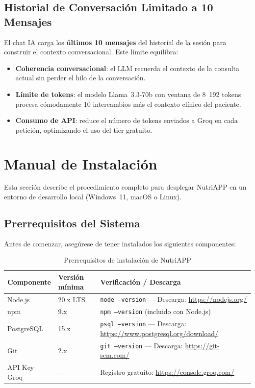 \documentclass[12pt,a4paper]{article}
\begin{document}
\subsection{Historial de Conversación Limitado a 10 Mensajes}

El chat IA carga los \textbf{últimos 10 mensajes} del historial de la sesión para
construir el contexto conversacional. Este límite equilibra:

\begin{itemize}[leftmargin=1.5em]
  \item \textbf{Coherencia conversacional}: el LLM recuerda el contexto de la
        consulta actual sin perder el hilo de la conversación.
  \item \textbf{Límite de tokens}: el modelo Llama~3.3-70b con ventana de 8~192
        tokens procesa cómodamente 10 intercambios más el contexto clínico del paciente.
  \item \textbf{Consumo de API}: reduce el número de tokens enviados a Groq en cada
        petición, optimizando el uso del tier gratuito.
\end{itemize}

\clearpage
\section{Manual de Instalación}

Esta sección describe el procedimiento completo para desplegar NutriAPP en un entorno
de desarrollo local (Windows~11, macOS o Linux).

\subsection{Prerrequisitos del Sistema}

Antes de comenzar, asegúrese de tener instalados los siguientes componentes:

\begin{table}[H]
\centering
\caption{Prerrequisitos de instalación de NutriAPP}
\label{tab:prereqs}
\begin{tabularx}{\linewidth}{|l|l|X|}
\hline
\textbf{Componente} & \textbf{Versión mínima} & \textbf{Verificación / Descarga} \\
\hline
Node.js  & 20.x LTS & \texttt{node --version} — Descarga: \url{https://nodejs.org/} \\
\hline
npm      & 9.x      & \texttt{npm --version} (incluido con Node.js) \\
\hline
PostgreSQL & 15.x   & \texttt{psql --version} — Descarga: \url{https://www.postgresql.org/download/} \\
\hline
Git      & 2.x      & \texttt{git --version} — Descarga: \url{https://git-scm.com/} \\
\hline
API Key Groq & ---  & Registro gratuito: \url{https://console.groq.com/} \\
\hline
\end{tabularx}
\end{table}
\end{document}

